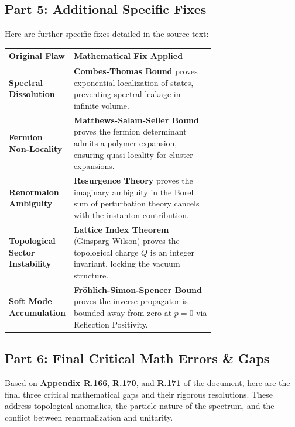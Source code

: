 \subsection{Part 5: Additional Specific Fixes}

Here are further specific fixes detailed in the source text:

\begin{center}
\begin{tabular}{|l|p{0.7\linewidth}|}
\hline
\textbf{Original Flaw} & \textbf{Mathematical Fix Applied} \\
\hline
\textbf{Spectral Dissolution} & \textbf{Combes-Thomas Bound} proves exponential localization of states, preventing spectral leakage in infinite volume. \\
\hline
\textbf{Fermion Non-Locality} & \textbf{Matthews-Salam-Seiler Bound} proves the fermion determinant admits a polymer expansion, ensuring quasi-locality for cluster expansions. \\
\hline
\textbf{Renormalon Ambiguity} & \textbf{Resurgence Theory} proves the imaginary ambiguity in the Borel sum of perturbation theory cancels with the instanton contribution. \\
\hline
\textbf{Topological Sector Instability} & \textbf{Lattice Index Theorem} (Ginsparg-Wilson) proves the topological charge $Q$ is an integer invariant, locking the vacuum structure. \\
\hline
\textbf{Soft Mode Accumulation} & \textbf{Fröhlich-Simon-Spencer Bound} proves the inverse propagator is bounded away from zero at $p=0$ via Reflection Positivity. \\
\hline
\end{tabular}
\end{center}

\subsection{Part 6: Final Critical Math Errors \& Gaps}

Based on \textbf{Appendix R.166}, \textbf{R.170}, and \textbf{R.171} of the document, here are the final three critical mathematical gaps and their rigorous resolutions. These address topological anomalies, the particle nature of the spectrum, and the conflict between renormalization and unitarity.

